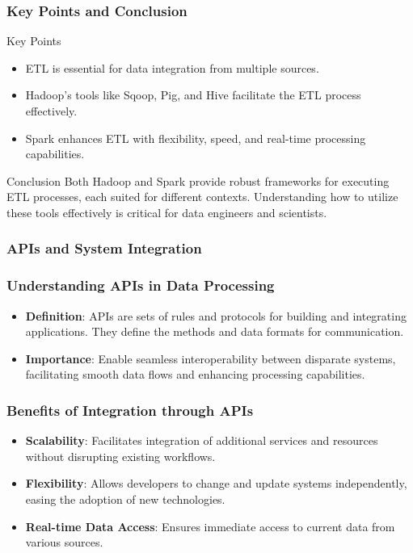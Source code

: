 \documentclass[aspectratio=169]{beamer}
\begin{document}
\begin{frame}[fragile]
    \frametitle{Key Points and Conclusion}
    \begin{block}{Key Points}
        \begin{itemize}
            \item ETL is essential for data integration from multiple sources.
            \item Hadoop's tools like Sqoop, Pig, and Hive facilitate the ETL process effectively.
            \item Spark enhances ETL with flexibility, speed, and real-time processing capabilities.
        \end{itemize}
    \end{block}
    \begin{block}{Conclusion}
        Both Hadoop and Spark provide robust frameworks for executing ETL processes, each suited for different contexts. Understanding how to utilize these tools effectively is critical for data engineers and scientists.
    \end{block}
\end{frame}

\begin{frame}[fragile]
    \frametitle{APIs and System Integration}
\end{frame}

\begin{frame}[fragile]
    \frametitle{Understanding APIs in Data Processing}
    \begin{itemize}
        \item \textbf{Definition}: APIs are sets of rules and protocols for building and integrating applications. They define the methods and data formats for communication.
        \item \textbf{Importance}: Enable seamless interoperability between disparate systems, facilitating smooth data flows and enhancing processing capabilities.
    \end{itemize}
\end{frame}

\begin{frame}[fragile]
    \frametitle{Benefits of Integration through APIs}
    \begin{itemize}
        \item \textbf{Scalability}: Facilitates integration of additional services and resources without disrupting existing workflows.
        \item \textbf{Flexibility}: Allows developers to change and update systems independently, easing the adoption of new technologies.
        \item \textbf{Real-time Data Access}: Ensures immediate access to current data from various sources.
    \end{itemize}
\end{frame}
\end{document}
